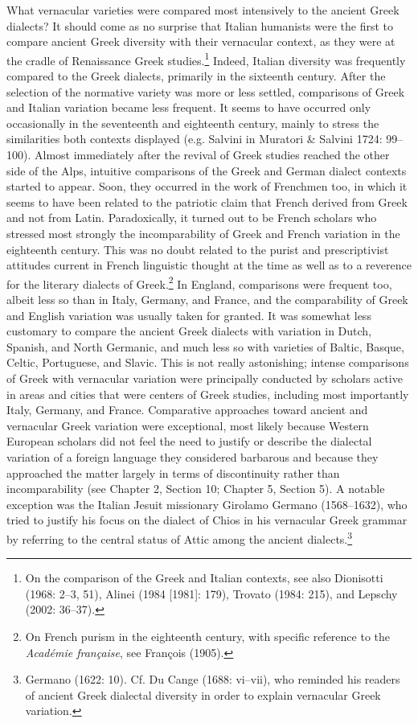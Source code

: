 \begin{styleStandard}
What vernacular varieties were compared most intensively to the ancient Greek dialects? It should come as no surprise that Italian humanists were the first to compare ancient Greek diversity with their vernacular context, as they were at the cradle of Renaissance Greek studies.\footnote{ On the comparison of the Greek and Italian contexts, see also Dionisotti (1968: 2–3, 51), Alinei (1984 [1981]: 179), Trovato (1984: 215), and Lepschy (2002: 36–37).} Indeed, Italian diversity was frequently compared to the Greek dialects, primarily in the sixteenth century. After the selection of the normative variety was more or less settled, comparisons of Greek and Italian variation became less frequent. It seems to have occurred only occasionally in the seventeenth and eighteenth century, mainly to stress the similarities both contexts displayed (e.g. Salvini in Muratori \& Salvini 1724: 99–100). Almost immediately after the revival of Greek studies reached the other side of the Alps, intuitive comparisons of the Greek and German dialect contexts started to appear. Soon, they occurred in the work of Frenchmen too, in which it seems to have been related to the patriotic claim that French derived from Greek and not from Latin. Paradoxically, it turned out to be French scholars who stressed most strongly the incomparability of Greek and French variation in the eighteenth century. This was no doubt related to the purist and prescriptivist attitudes current in French linguistic thought at the time as well as to a reverence for the literary dialects of Greek.\footnote{ On French purism in the eighteenth century, with specific reference to the \textit{Académie française}, see François (1905).} In England, comparisons were frequent too, albeit less so than in Italy, Germany, and France, and the comparability of Greek and English variation was usually taken for granted. It was somewhat less customary to compare the ancient Greek dialects with variation in Dutch, Spanish, and North Germanic, and much less so with varieties of Baltic, Basque, Celtic, Portuguese, and Slavic. This is not really astonishing; intense comparisons of Greek with vernacular variation were principally conducted by scholars active in areas and cities that were centers of Greek studies, including most importantly Italy, Germany, and France. Comparative approaches toward ancient and vernacular Greek variation were exceptional, most likely because Western European scholars did not feel the need to justify or describe the dialectal variation of a foreign language they considered barbarous and because they approached the matter largely in terms of discontinuity rather than incomparability (see Chapter 2, Section 10; Chapter 5, Section 5). A notable exception was the Italian Jesuit missionary Girolamo Germano (1568–1632), who tried to justify his focus on the dialect of Chios in his vernacular Greek grammar by referring to the central status of Attic among the ancient dialects.\footnote{ Germano (1622: 10). Cf. Du Cange (1688: vi–vii), who reminded his readers of ancient Greek dialectal diversity in order to explain vernacular Greek variation.}
\end{styleStandard}

